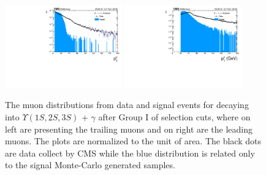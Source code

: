 \begin{figure}[!htbp]
\begin{center}
\includegraphics[width=0.45\textwidth]{figures_and_tables/outputPlots/ZtoUpsilon_Cat0_ZZZZZ/au/data_x_mc/noKinCuts/h_noKin_TrailingMu_pt}\hspace*{1.cm}
\includegraphics[width=0.45\textwidth]{figures_and_tables/outputPlots/ZtoUpsilon_Cat0_ZZZZZ/au/data_x_mc/noKinCuts/h_noKin_LeadingMu_pt}
\end{center}\vspace*{-.5cm}
\caption{The \PT muon distributions from data and signal events for \Z decaying into $\Upsilon(1S,2S,3S)$ + $\gamma$ after Group I of selection cuts, where on left are presenting the trailing muons and on right are the leading muons. The plots are normalized to the unit of area. The black dots are data collect by CMS while the blue distribution is related only to the signal Monte-Carlo generated samples.}
\label{fig:pTMuons_ZtoUpsilon_Cat0}
\end{figure}


